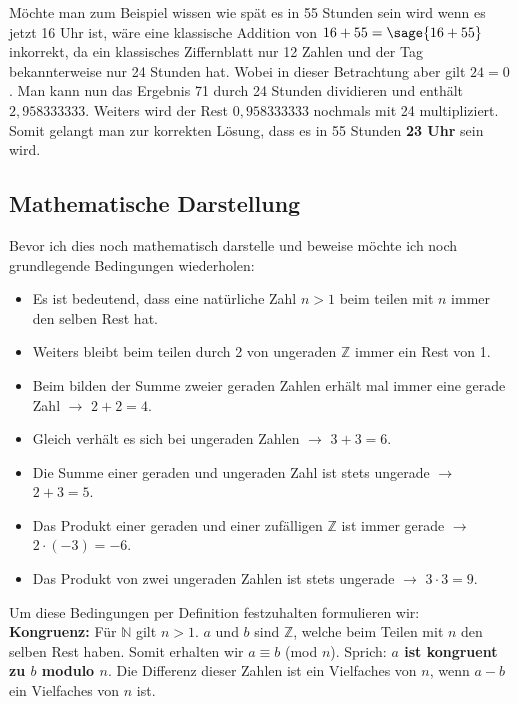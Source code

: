 \documentclass[german,12pt,a4paper]{article}
\begin{document}
Möchte man zum Beispiel wissen wie spät es in 55 Stunden sein wird wenn es jetzt 16 Uhr ist, wäre eine klassische Addition von $16+55=\sage{16+55}$ inkorrekt, da ein klassisches Ziffernblatt nur 12 Zahlen und der Tag bekannterweise nur 24 Stunden hat.
Wobei in dieser Betrachtung aber gilt $24=0$.
Man kann nun das Ergebnis 71 durch 24 Stunden dividieren und enthält $2,958333333$.
Weiters wird der Rest $0,958333333$ nochmals mit 24 multipliziert.
Somit gelangt man zur korrekten Lösung, dass es in 55 Stunden \textbf{23 Uhr} sein wird.

\subsection{Mathematische Darstellung}\label{Mathematische Darstellung}
Bevor ich dies noch mathematisch darstelle und beweise möchte ich noch grundlegende Bedingungen wiederholen:
\begin{itemize}
    \item Es ist bedeutend, dass eine natürliche Zahl $n>1$ beim teilen mit $n$ immer den selben Rest hat.
    \item Weiters bleibt beim teilen durch 2 von ungeraden $\mathbb{Z}$ immer ein Rest von 1.
    \item Beim bilden der Summe zweier geraden Zahlen erhält mal immer eine gerade Zahl $\rightarrow$ $2+2=4$.
    \item Gleich verhält es sich bei ungeraden Zahlen $\rightarrow$ $3+3=6$.
    \item Die Summe einer geraden und ungeraden Zahl ist stets ungerade $\rightarrow$ $2+3=5$.
    \item Das Produkt einer geraden und einer zufälligen $\mathbb{Z}$ ist immer gerade $\rightarrow$ $2 \cdot (-3) = -6$.
    \item Das Produkt von zwei ungeraden Zahlen ist stets ungerade $\rightarrow$ $3 \cdot 3 = 9$.
\end{itemize}

Um diese Bedingungen per Definition festzuhalten formulieren wir:\\
\textbf{Kongruenz:} Für $\mathbb{N}$ gilt $n>1$.
$a$ und $b$ sind $\mathbb{Z}$, welche beim Teilen mit $n$ den selben Rest haben.
Somit erhalten wir $a\equiv b$ (mod $n$). Sprich: \textbf{$a$ ist kongruent zu $b$ modulo $n$}.
Die Differenz dieser Zahlen ist ein Vielfaches von $n$, wenn $a-b$ ein Vielfaches von $n$ ist.
\end{document}
